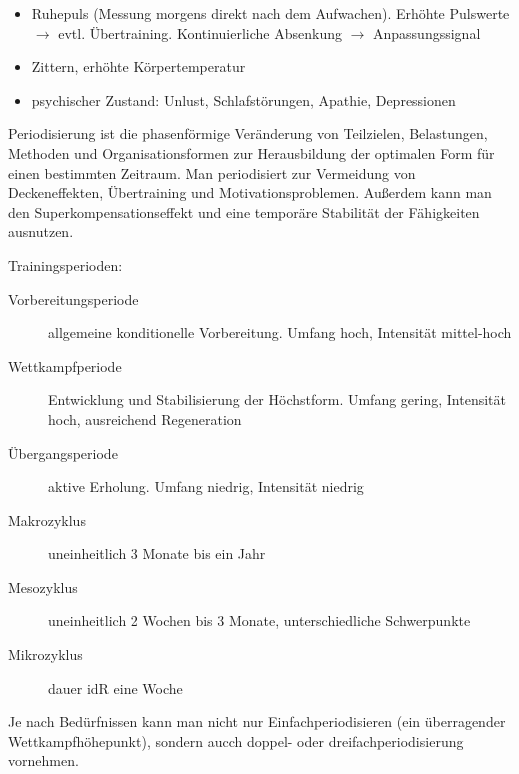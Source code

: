 \begin{itemize}
    \item Ruhepuls (Messung morgens direkt nach dem Aufwachen). Erhöhte Pulswerte $\rightarrow$ evtl. Übertraining. Kontinuierliche Absenkung $\rightarrow$ Anpassungssignal
    \item Zittern, erhöhte Körpertemperatur
    \item psychischer Zustand: Unlust, Schlafstörungen, Apathie, Depressionen
\end{itemize}

Periodisierung ist die phasenförmige Veränderung von Teilzielen, Belastungen, Methoden und Organisationsformen zur Herausbildung der optimalen Form für einen bestimmten Zeitraum. Man periodisiert zur Vermeidung von Deckeneffekten, Übertraining und Motivationsproblemen. Außerdem kann man den Superkompensationseffekt und eine temporäre Stabilität der Fähigkeiten ausnutzen.

Trainingsperioden:
\begin{description}
    \item[Vorbereitungsperiode] allgemeine konditionelle Vorbereitung. Umfang hoch, Intensität mittel-hoch
    \item[Wettkampfperiode] Entwicklung und Stabilisierung der Höchstform. Umfang gering, Intensität hoch, ausreichend Regeneration
    \item [Übergangsperiode] aktive Erholung. Umfang niedrig, Intensität niedrig
    \item [Makrozyklus] uneinheitlich 3 Monate bis ein Jahr
    \item [Mesozyklus] uneinheitlich 2 Wochen bis 3 Monate, unterschiedliche Schwerpunkte
    \item [Mikrozyklus] dauer idR eine Woche
\end{description}

Je nach Bedürfnissen kann man nicht nur Einfachperiodisieren (ein überragender Wettkampfhöhepunkt), sondern aucch doppel- oder dreifachperiodisierung vornehmen.

